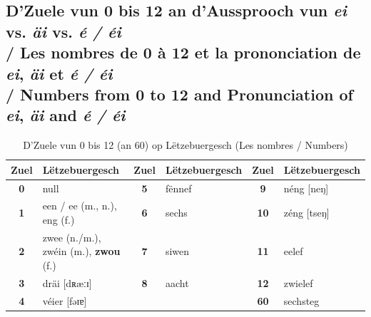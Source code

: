 \subsection{D'Zuele vun 0 bis 12 an d'Aussprooch vun \textit{ei} vs. \textit{äi} vs. \textit{é / éi} \\/ Les nombres de 0 à 12 et la prononciation de \textit{ei}, \textit{äi} et \textit{é / éi} \\/ Numbers from 0 to 12 and Pronunciation of \textit{ei}, \textit{äi} and \textit{é / éi}}

\begin{table}[htbp]
    \centering
    \small
    \begin{tabular}{cl cl cl}
        \toprule
        \textbf{Zuel} & \textbf{Lëtzebuergesch} & \textbf{Zuel} & \textbf{Lëtzebuergesch} & \textbf{Zuel} & \textbf{Lëtzebuergesch} \\
        \midrule
        \textbf{0} & null & \textbf{5} & fënnef & \textbf{9} & néng {[neŋ]} \\
        \textbf{1} & een / ee (m., n.), eng (f.) & \textbf{6} & sechs & \textbf{10} & zéng {[tseŋ]} \\
        \textbf{2} & zwee (n./m.), zwéin (m.), \textbf{zwou} (f.) & \textbf{7} & siwen & \textbf{11} & eelef \\
        \textbf{3} & dräi {[dʀæːɪ]} & \textbf{8} & aacht & \textbf{12} & zwielef \\
        \textbf{4} & véier {[fəɪɐ]} & & & \textbf{60} & sechsteg \\
        \bottomrule
    \end{tabular}
    \caption{D'Zuele vun 0 bis 12 (an 60) op Lëtzebuergesch (Les nombres / Numbers)}
\end{table}

